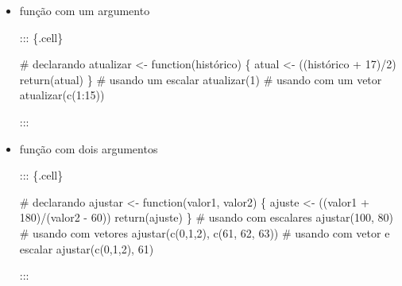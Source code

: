 \documentclass[
  letterpaper,
  DIV=11,
  numbers=noendperiod]{scrreprt}
\newenvironment{Shaded}{\begin{snugshade}}{\end{snugshade}}
\newcommand{\CommentTok}[1]{\textcolor[rgb]{0.37,0.37,0.37}{#1}}
\newcommand{\ControlFlowTok}[1]{\textcolor[rgb]{0.00,0.23,0.31}{#1}}
\newcommand{\DecValTok}[1]{\textcolor[rgb]{0.68,0.00,0.00}{#1}}
\newcommand{\FunctionTok}[1]{\textcolor[rgb]{0.28,0.35,0.67}{#1}}
\newcommand{\NormalTok}[1]{\textcolor[rgb]{0.00,0.23,0.31}{#1}}
\newcommand{\OtherTok}[1]{\textcolor[rgb]{0.00,0.23,0.31}{#1}}
\newcommand{\SpecialCharTok}[1]{\textcolor[rgb]{0.37,0.37,0.37}{#1}}
\begin{document}
\begin{itemize}
\item
  função com um argumento

  ::: \{.cell\}

\begin{Shaded}
\begin{Highlighting}[]
\CommentTok{\# declarando}
\NormalTok{atualizar }\OtherTok{\textless{}{-}} \ControlFlowTok{function}\NormalTok{(histórico) \{}
\NormalTok{    atual }\OtherTok{\textless{}{-}}\NormalTok{ ((histórico }\SpecialCharTok{+} \DecValTok{17}\NormalTok{)}\SpecialCharTok{/}\DecValTok{2}\NormalTok{)}
    \FunctionTok{return}\NormalTok{(atual)}
\NormalTok{\}}
\CommentTok{\# usando um escalar}
\FunctionTok{atualizar}\NormalTok{(}\DecValTok{1}\NormalTok{)}
\CommentTok{\# usando com um vetor}
\FunctionTok{atualizar}\NormalTok{(}\FunctionTok{c}\NormalTok{(}\DecValTok{1}\SpecialCharTok{:}\DecValTok{15}\NormalTok{))}
\end{Highlighting}
\end{Shaded}

  :::
\item
  função com dois argumentos

  ::: \{.cell\}

\begin{Shaded}
\begin{Highlighting}[]
\CommentTok{\# declarando}
\NormalTok{ajustar }\OtherTok{\textless{}{-}} \ControlFlowTok{function}\NormalTok{(valor1, valor2) \{}
\NormalTok{    ajuste }\OtherTok{\textless{}{-}}\NormalTok{ ((valor1 }\SpecialCharTok{+} \DecValTok{180}\NormalTok{)}\SpecialCharTok{/}\NormalTok{(valor2 }\SpecialCharTok{{-}} \DecValTok{60}\NormalTok{))}
    \FunctionTok{return}\NormalTok{(ajuste)}
\NormalTok{\}}
\CommentTok{\# usando com escalares}
\FunctionTok{ajustar}\NormalTok{(}\DecValTok{100}\NormalTok{, }\DecValTok{80}\NormalTok{)}
\CommentTok{\# usando com vetores}
\FunctionTok{ajustar}\NormalTok{(}\FunctionTok{c}\NormalTok{(}\DecValTok{0}\NormalTok{,}\DecValTok{1}\NormalTok{,}\DecValTok{2}\NormalTok{), }\FunctionTok{c}\NormalTok{(}\DecValTok{61}\NormalTok{, }\DecValTok{62}\NormalTok{, }\DecValTok{63}\NormalTok{)) }
\CommentTok{\# usando com vetor  e escalar}
\FunctionTok{ajustar}\NormalTok{(}\FunctionTok{c}\NormalTok{(}\DecValTok{0}\NormalTok{,}\DecValTok{1}\NormalTok{,}\DecValTok{2}\NormalTok{), }\DecValTok{61}\NormalTok{)}
\end{Highlighting}
\end{Shaded}

  :::
\end{itemize}
\end{document}
